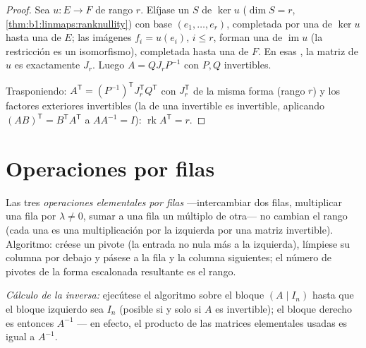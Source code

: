 \begin{proof}
Sea $u \colon E \to F$ de rango $r$. Elíjase un  $S$ de
$\ker u$ ($\dim S = r$, \cref{thm:b1:linmaps:ranknullity}) con base
$(e_1, \dots, e_r)$, completada por una  de $\ker u$ hasta una
 de $E$; las imágenes $f_i = u(e_i)$, $i \leq r$, forman una
 de $\operatorname{im} u$ (la restricción es un isomorfismo),
completada hasta una  de $F$. En esas , la matriz de $u$ es
exactamente $J_r$. Luego $A = Q J_r P^{-1}$ con $P, Q$ invertibles.

Trasponiendo:
$A^{\mathsf T} = (P^{-1})^{\mathsf T} J_r^{\mathsf T} Q^{\mathsf T}$
con $J_r^{\mathsf T}$ de la misma forma (rango $r$) y los factores
exteriores invertibles (la  de una invertible es
invertible, aplicando $(AB)^{\mathsf T} = B^{\mathsf T}A^{\mathsf T}$
a $AA^{-1} = I$): $\operatorname{rk} A^{\mathsf T} = r$.
\end{proof}

\section{Operaciones por filas}

\begin{method}\label{met:b1:matrices:gauss}
Las tres \emph{operaciones elementales por
filas} ---intercambiar dos filas,
multiplicar una fila por $\lambda \neq 0$, sumar a una fila un
múltiplo de otra--- no cambian el rango (cada una es una
multiplicación por la izquierda por una matriz invertible).
Algoritmo: créese un pivote (la entrada no nula más a la izquierda),
límpiese su columna por debajo y pásese a la fila y la columna
siguientes; el número de pivotes de la forma escalonada resultante es
el rango.

\emph{Cálculo de la inversa:} ejecútese el algoritmo sobre el bloque
$(A \mid I_n)$ hasta que el bloque izquierdo sea $I_n$ (posible si y
solo si $A$ es invertible); el bloque derecho es entonces $A^{-1}$
--- en efecto, el producto de las matrices elementales usadas es
igual a $A^{-1}$.
\end{method}

